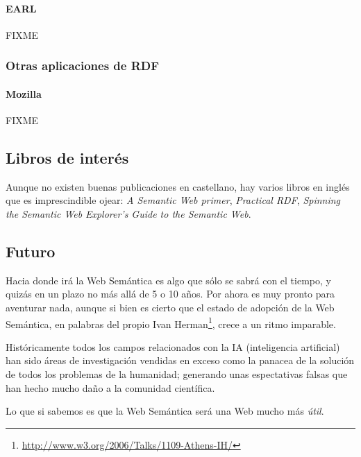 \paragraph{EARL}

FIXME

\subsubsection{Otras aplicaciones de RDF}

\paragraph{Mozilla}

FIXME

\subsection{Libros de interés}

Aunque no existen buenas publicaciones en castellano, hay varios libros en inglés 
que es imprescindible ojear: \emph{A Semantic Web primer}\cite{SemanticWebPrimer},
\emph{Practical RDF}\cite{PracticalRDF}, 
\emph{Spinning the Semantic Web}\cite{SpinningSemanticWeb}
\emph{Explorer's Guide to the Semantic Web}\cite{ExplorerSemanticWeb}.

\subsection{Futuro}

Hacia donde irá la Web Semántica es algo que sólo se sabrá con el tiempo, y quizás
en un plazo no más allá de 5 o 10 años. Por ahora es muy pronto para aventurar nada,
aunque si bien es cierto que el estado de adopción de la Web Semántica, en palabras
del propio Ivan Herman\footnote{\url{http://www.w3.org/2006/Talks/1109-Athens-IH/}},
crece a un ritmo imparable.

Históricamente todos los campos relacionados con la IA (inteligencia artificial) 
han sido áreas de investigación vendidas en exceso como la panacea de la solución 
de todos los problemas de la humanidad; generando unas espectativas falsas que han 
hecho mucho daño a la comunidad científica.

Lo que si sabemos es que la Web Semántica será una Web mucho más \emph{útil}.
